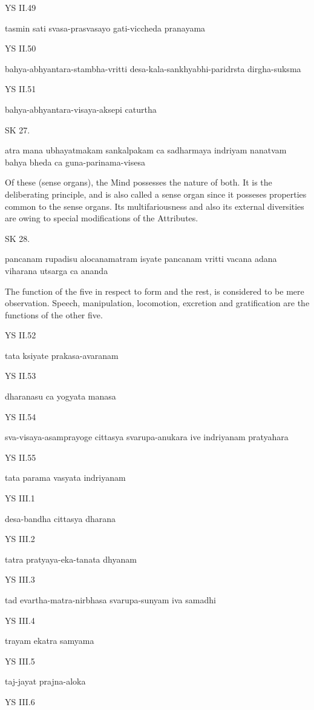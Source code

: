 YS II.49

    tasmin sati svasa-prasvasayo gati-viccheda pranayama

YS II.50

    bahya-abhyantara-stambha-vritti desa-kala-sankhyabhi-paridrsta dirgha-suksma

YS II.51

    bahya-abhyantara-visaya-aksepi caturtha

SK 27.

atra mana ubhayatmakam sankalpakam ca sadharmaya indriyam
nanatvam bahya bheda ca guna-parinama-visesa

Of these (sense organs), the Mind possesses the nature of both.
It is the deliberating principle, and is also called a sense organ
since it posseses properties common to the sense organs.
Its multifariousness and also its external diversities are owing
to special modifications of the Attributes.

SK 28.

pancanam rupadisu alocanamatram isyate
pancanam vritti vacana adana viharana utsarga ca ananda

The function of the five in respect to form and the rest,
is considered to be mere observation.
Speech, manipulation, locomotion, excretion and gratification
are the functions of the other five.

YS II.52

    tata ksiyate prakasa-avaranam

YS II.53

    dharanasu ca yogyata manasa

YS II.54

    sva-visaya-asamprayoge cittasya svarupa-anukara ive indriyanam pratyahara

YS II.55

    tata parama vasyata indriyanam

YS III.1

    desa-bandha cittasya dharana

YS III.2

    tatra pratyaya-eka-tanata dhyanam

YS III.3

    tad evartha-matra-nirbhasa svarupa-sunyam iva samadhi

YS III.4

    trayam ekatra samyama

YS III.5

    taj-jayat prajna-aloka

YS III.6

